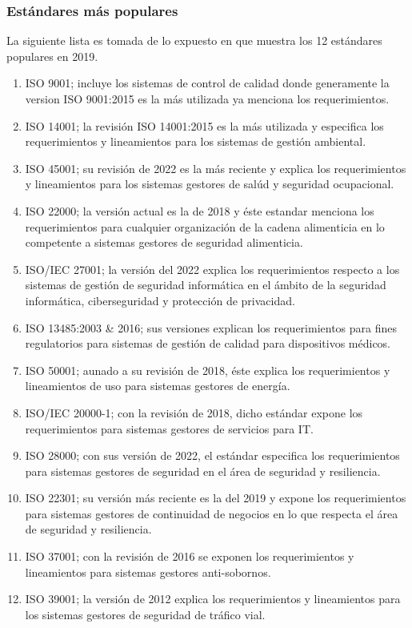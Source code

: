 \subsubsection{Estándares más populares}
La siguiente lista es tomada de lo expuesto en %
que muestra los 12 estándares populares en 2019.
\begin{enumerate}
    \item ISO 9001; incluye los sistemas de control de calidad donde generamente la version ISO 9001:2015 es la más utilizada ya menciona los requerimientos. %
    \item ISO 14001; la revisión ISO 14001:2015 es la más utilizada y especifica los requerimientos y lineamientos para los sistemas de gestión ambiental. %
    \item ISO 45001; su revisión de 2022 es la más reciente y explica los requerimientos y lineamientos para los sistemas gestores de salúd y seguridad ocupacional. %
    \item ISO 22000; la versión actual es la de 2018 y éste estandar menciona los requerimientos para cualquier organización de la cadena alimenticia en lo competente a sistemas gestores de seguridad alimenticia. %
    \item ISO/IEC 27001; la versión del 2022 explica los requerimientos respecto a los sistemas de gestión de seguridad informática en el ámbito de la seguridad informática, ciberseguridad y protección de privacidad. %
    \item ISO 13485:2003 \& 2016; sus versiones explican los requerimientos para fines regulatorios para sistemas de gestión de calidad para dispositivos médicos. %
    \item ISO 50001; aunado a su revisión de 2018, éste explica los requerimientos y lineamientos de uso para sistemas gestores de energía. %
    \item ISO/IEC 20000-1; con la revisión de 2018, dicho estándar expone los requerimientos para sistemas gestores de servicios para IT. %
    \item ISO 28000; con sus versión de 2022, el estándar especifica los requerimientos para sistemas gestores de seguridad en el área de seguridad y resiliencia. %
    \item ISO 22301; su versión más reciente es la del 2019 y expone los requerimientos para sistemas gestores de continuidad de negocios en lo que respecta el área de seguridad y resiliencia. %
    \item ISO 37001; con la revisión de 2016 se exponen los requerimientos y lineamientos para sistemas gestores anti-sobornos. %
    \item ISO 39001; la versión de 2012 explica los requerimientos y lineamientos para los sistemas gestores de seguridad de tráfico vial. %
\end{enumerate}

